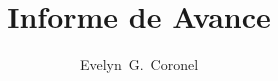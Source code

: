\documentclass{ibtesis}
\title{Informe de Avance}
\author{Evelyn~G.~Coronel}
\begin{document}
\begin{preliminary}


%

	\tableofcontents                %
	\listoffigures                  %


\end{preliminary}
\end{document}
